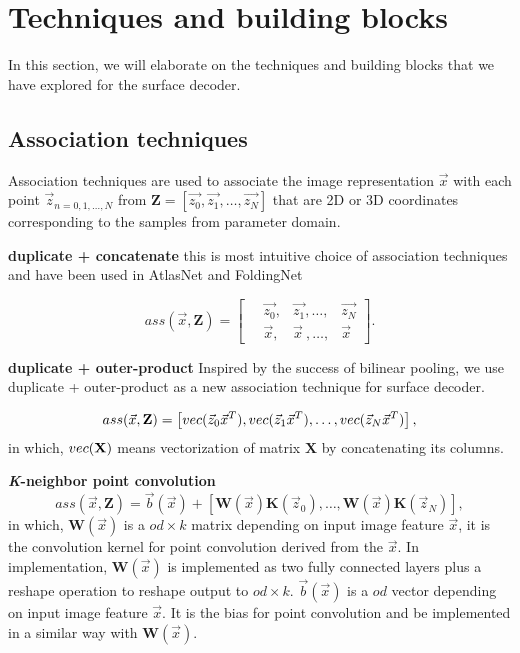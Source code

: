 \section{Techniques and building blocks}
In this section, we will elaborate on the techniques and building blocks that we have explored for the surface decoder. 
\subsection{Association techniques}
Association techniques are used to associate the image representation $\vec{x}$ with each point $\vec{z}_{n={0,1,\dots,N}}$ from $\mathbf{Z}=[\vec{z_0},\vec{z_1},\dots,\vec{z_N}]$ that are 2D or 3D coordinates corresponding to the samples from parameter domain.

\noindent\textbf{duplicate + concatenate}
this is most intuitive choice of association techniques and have been used in AtlasNet\cite{atlasnet} and FoldingNet\cite{foldingnet}

\begin{equation}
ass(\vec{x},\mathbf{Z})=\left[
\begin{aligned}
~&\vec{z_0},&\vec{z_1},\dots,&\vec{z_N}\\
~&\vec{x}  ,&\vec{x}~,\dots,&\vec{x}
\end{aligned}
\right].
\end{equation}

\noindent\textbf{duplicate + outer-product} 
Inspired by the success of bilinear pooling, we use duplicate + outer-product as a new association technique for surface decoder. 

\begin{equation}
ass(\vec{x},\mathbf{Z})=\left[
~\\vec(\vec{z}_0\vec{x}^T),\\vec(\vec{z}_1\vec{x}^T),\dots,\\vec(\vec{z}_N\vec{x}^T)\\
\right],
\end{equation}in which, $\\vec(\mathbf{X})$ means vectorization of matrix $\mathbf{X}$ by concatenating its columns.

\noindent\textbf{\emph{K}-neighbor point convolution}
\begin{equation}
ass(\vec{x},\mathbf{Z})=\vec{b}(\vec{x})+[ \mathbf{W}(\vec{x})\mathbf{K}(\vec{z}_0),\dots,\mathbf{W}(\vec{x})\mathbf{K}(\vec{z}_N)],
\end{equation}
in which, $\mathbf{W}(\vec{x})$ is a $od \times k$ matrix depending on input image feature $\vec{x}$, it is the convolution kernel for point convolution derived from the $\vec{x}$. In implementation, $\mathbf{W}(\vec{x})$ is implemented as two fully connected layers plus a reshape operation to reshape output to $od \times k$. $\vec{b}(\vec{x})$ is a $od$ vector depending on input image feature $\vec{x}$. It is the bias for point convolution and be implemented in a similar way with $\mathbf{W}(\vec{x})$.

